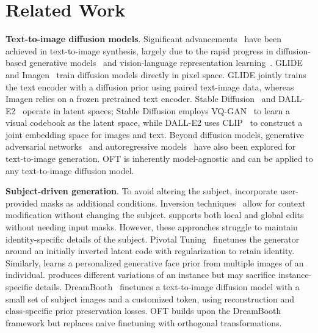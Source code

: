 \section{Related Work}

\textbf{Text-to-image diffusion models}. Significant advancements~\cite{saharia2022photorealistic,ramesh2022hierarchical,rombach2022high,gu2022vector,nichol2022glide} have been achieved in text-to-image synthesis, largely due to the rapid progress in diffusion-based generative models~\cite{ho2020denoising,song2021score,song2021denoising,dhariwal2021diffusion} and vision-language representation learning~\cite{su2020vlbert,lu2019vilbert,radford2021learning,wang2021simvlm,li2022blip,li2023blip,alayrac2022flamingo,schuhmann2022laion}. GLIDE~\cite{nichol2022glide} and Imagen~\cite{saharia2022photorealistic} train diffusion models directly in pixel space. GLIDE jointly trains the text encoder with a diffusion prior using paired text-image data, whereas Imagen relies on a frozen pretrained text encoder. Stable Diffusion~\cite{rombach2022high} and DALL-E2~\cite{ramesh2022hierarchical} operate in latent spaces; Stable Diffusion employs VQ-GAN~\cite{esser2021taming} to learn a visual codebook as the latent space, while DALL-E2 uses CLIP~\cite{radford2021learning} to construct a joint embedding space for images and text. Beyond diffusion models, generative adversarial networks~\cite{reed2016generative,zhang2017stackgan,xu2018attngan,li2019controllable} and autoregressive models~\cite{ramesh2021zero,ding2021cogview,wu2022nuwa,yuscaling} have also been explored for text-to-image generation. OFT is inherently model-agnostic and can be applied to any text-to-image diffusion model.

\textbf{Subject-driven generation}. To avoid altering the subject, \cite{avrahami2022blended,nichol2022glide} incorporate user-provided masks as additional conditions. Inversion techniques~\cite{choi2021ilvr,dhariwal2021diffusion,ramesh2022hierarchical,gal2022image} allow for context modification without changing the subject. \cite{hertz2022prompt} supports both local and global edits without needing input masks. However, these approaches struggle to maintain identity-specific details of the subject. Pivotal Tuning~\cite{roich2022pivotal} finetunes the generator around an initially inverted latent code with regularization to retain identity. Similarly, \cite{nitzan2022mystyle} learns a personalized generative face prior from multiple images of an individual. \cite{casanova2021instance} produces different variations of an instance but may sacrifice instance-specific details. DreamBooth~\cite{ruiz2023dreambooth} finetunes a text-to-image diffusion model with a small set of subject images and a customized token, using reconstruction and class-specific prior preservation losses. OFT builds upon the DreamBooth framework but replaces naive finetuning with orthogonal transformations.

